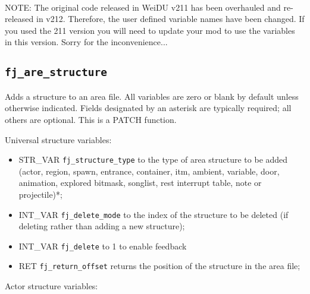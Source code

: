 \documentclass{article}
\def\DEFINE#1{{\tt \bf #1}\label{#1}\index{#1}}
\begin{document}
\\
NOTE: The original code released in WeiDU v211 has been overhauled and re-released in v212. Therefore, the user defined variable names have been changed. If you used the 211 version you will need to update your mod to use the variables in this version. Sorry for the inconvenience...


\subsection{\DEFINE{fj_are_structure}}
Adds a structure to an area file. All variables are zero or blank by default unless otherwise indicated. Fields designated by an asterisk are typically required; all others are optional.
This is a PATCH function.

Universal structure variables:
\begin{itemize}
\item STR_VAR \verb+fj_structure_type+ to the type of area structure to be added (actor, region, spawn, entrance, container, itm, ambient, variable, door, animation, explored bitmask, songlist, rest interrupt table, note or projectile)*;
\item INT_VAR \verb+fj_delete_mode+ to the index of the structure to be deleted (if deleting rather than adding a new structure);
\item INT_VAR \verb+fj_delete+ to 1 to enable feedback
\item RET \verb+fj_return_offset+ returns the position of the structure in the area file;
\end{itemize}
Actor structure variables:
\end{document}
